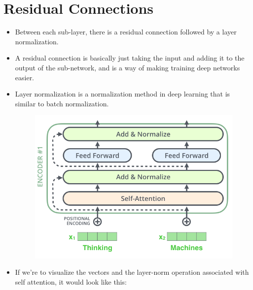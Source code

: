 \section{Residual Connections}
\begin{itemize}

\item Between each sub-layer, there is a residual connection followed by a layer normalization. 

\item A residual connection is basically just taking the input and adding it to the output of the sub-network, and is a way of making training deep networks easier. 

\item Layer normalization is a normalization method in deep learning that is similar to batch normalization.
 
 \begin{figure}[h]
        	\includegraphics[scale = 0.3]{pics/transformer_resideual_layer_norm.png}
        \end{figure}




\item If we’re to visualize the vectors and the layer-norm operation associated with self attention, it would look like this:

\end{itemize}


